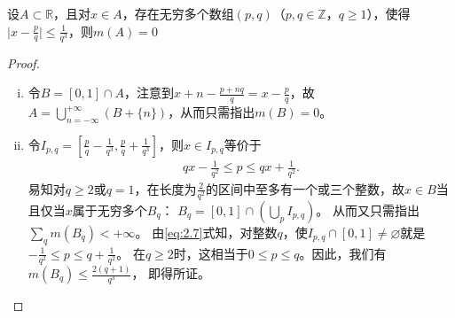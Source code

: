\documentclass[../../main.tex]{subfiles}%
\begin{document}
\begin{example}
设\(A\subset\mathbb{R}\)，且对\(x\in A\)，存在无穷多个数组\((p,q)\)（\(p,q\in\mathbb{Z}\)，\(q\geqslant1\)），使得\(\vert x - \frac{p}{q}\vert\leqslant \frac{1}{q^3}\)，则\(m(A)=0\)
\end{example}
\begin{proof}
\begin{enumerate}[(i)]
\item 令\(B = [0,1]\cap A\)，注意到\(x + n-\frac{p + nq}{q}=x - \frac{p}{q}\)，故\(A=\bigcup_{n = -\infty}^{+\infty}(B+\{n\})\)，从而只需指出\(m(B)=0\)。
\item 令\(I_{p,q}=\left[\frac{p}{q}-\frac{1}{q^3},\frac{p}{q}+\frac{1}{q^3}\right]\)，则\(x\in I_{p,q}\)等价于
\begin{align}
qx-\frac{1}{q^2}\leqslant p\leqslant qx+\frac{1}{q^2}.\label{eq:2.7}
\end{align}
易知对\(q\geqslant2\)或\(q = 1\)，在长度为\(\frac{2}{q^2}\)的区间中至多有一个或三个整数，故\(x\in B\)当且仅当\(x\)属于无穷多个\(B_q\)：
\(B_q = [0,1]\cap\left(\bigcup_{p}I_{p,q}\right)\)。
从而又只需指出\(\sum_{q}m(B_q)<+\infty\)。
由\eqref{eq:2.7}式知，对整数\(q\)，使\(I_{p,q}\cap[0,1]\neq\varnothing\)就是
\(-\frac{1}{q^2}\leqslant p\leqslant q+\frac{1}{q^2}\)。
在\(q\geqslant2\)时，这相当于\(0\leqslant p\leqslant q\)。因此，我们有
\(m(B_q)\leqslant \frac{2(q+1)}{q^3}\)，
即得所证。
\end{enumerate} 

\end{proof}
\end{document}

